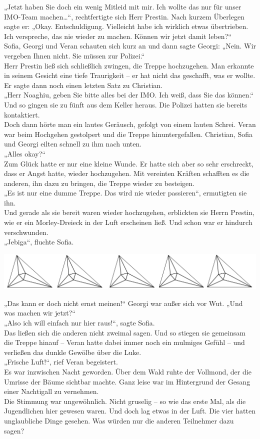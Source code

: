 \documentclass[oneside]{memoir}
\newcommand{\parasep}{
\bigskip
\bigskip
\begin{center} 
   \includegraphics[scale=.08]{parasep5.jpg} 
\end{center}
\bigskip
\bigskip
}
\begin{document}
„Jetzt haben Sie doch ein wenig Mitleid mit mir. Ich wollte das nur für unser IMO-Team machen\ldots“, rechtfertigte sich Herr Prestin. Nach kurzem Überlegen sagte er: „Okay. Entschuldigung. Vielleicht habe ich wirklich etwas übertrieben. Ich verspreche, das nie wieder zu machen. Können wir jetzt damit leben?“ \\
Sofia, Georgi und Veran schauten sich kurz an und dann sagte Georgi: 
„Nein. Wir vergeben Ihnen nicht. Sie müssen zur Polizei.“ \\
Herr Prestin ließ sich schließlich zwingen, die Treppe hochzugehen. Man erkannte in seinem Gesicht eine tiefe Traurigkeit -- er hat nicht das geschafft, was er wollte. Er sagte dann noch einen letzten Satz zu Christian. \\
„Herr Noaghiu, geben Sie bitte alles bei der IMO. Ich weiß, dass Sie das können.“ \\
Und so gingen sie zu fünft aus dem Keller heraus. Die Polizei hatten sie bereits kontaktiert. \\
Doch dann hörte man ein lautes Geräusch, gefolgt von einem lauten Schrei. Veran war beim Hochgehen gestolpert und die Treppe hinuntergefallen. Christian, Sofia und Georgi eilten schnell zu ihm nach unten. \\
„Alles okay?“ \\
Zum Glück hatte er nur eine kleine Wunde. Er hatte sich aber so sehr erschreckt, dass er Angst hatte, wieder hochzugehen. Mit vereinten Kräften schafften es die anderen, ihn dazu zu bringen, die Treppe wieder zu besteigen. \\
„Es ist nur eine dumme Treppe. Das wird nie wieder passieren“, ermutigten sie ihn. \\
Und gerade als sie bereit waren wieder hochzugehen, erblickten sie Herrn Prestin, wie er ein Morley-Dreieck in der Luft erscheinen ließ. Und schon war er hindurch verschwunden. \\
„Jebiga“, fluchte Sofia.

\parasep
     
\noindent „Das kann er doch nicht ernst meinen!“ Georgi war außer sich vor Wut. „Und was machen wir jetzt?“ \\
„Also ich will einfach nur hier raus!“, sagte Sofia. \\
Das ließen sich die anderen nicht zweimal sagen. Und so stiegen sie gemeinsam die Treppe hinauf -- Veran hatte dabei immer noch ein mulmiges Gefühl -- und verließen das dunkle Gewölbe über die Luke. \\
„Frische Luft!“, rief Veran begeistert. \\
Es war inzwischen Nacht geworden. Über dem Wald ruhte der Vollmond, der die Umrisse der Bäume sichtbar machte. Ganz leise war im Hintergrund der Gesang einer Nachtigall zu vernehmen. \\
Die Stimmung war ungewöhnlich. Nicht gruselig – so wie das erste Mal, als die Jugendlichen hier gewesen waren. Und doch lag etwas in der Luft. Die vier hatten unglaubliche Dinge gesehen. Was würden nur die anderen Teilnehmer dazu sagen?
\end{document}

